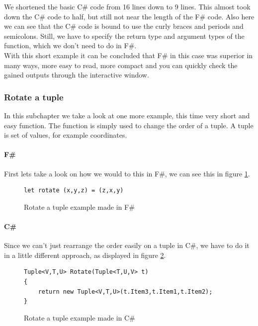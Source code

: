 \documentclass[12pt, a4paper]{article}
\begin{document}
We shortened the basic C\# code from 16 lines down to 9 lines. This almost took down the C\# code to half, but still not near the length of the F\# code. Also here we can see that the C\# code is bound to use the  curly braces and periods and semicolons. Still, we have to specify the return type and argument types of the function, which we don't need to do in F\#.\\

With this short example it can be concluded that F\# in this case was superior in many ways, more easy to read, more compact and you can quickly check the gained outputs through the interactive window. 

\newpage
\subsubsection{Rotate a tuple}
In this subchapter we take a look at one more example, this time very short and easy function. The function is simply used to change the order of a tuple. A tuple is set of values, for example coordinates.
   
\paragraph{F\#} First lets take a look on how we would to this in F\#, we can see this in figure \ref{fig:RotateTupleFSharp}.

\begin{figure}[!h]
\begin{lstlisting}
let rotate (x,y,z) = (z,x,y)
\end{lstlisting}
\caption{Rotate a tuple example made in F\#}
\label{fig:RotateTupleFSharp}
\end{figure}

\paragraph{C\#} Since we can’t just rearrange the order easily on a tuple in C\#, we have to do it in a little different approach, as displayed in figure \ref{fig:RotateTupleCSharp}.

\begin{figure}[!h]
\begin{lstlisting}
Tuple<V,T,U> Rotate(Tuple<T,U,V> t) 
{ 
    return new Tuple<V,T,U>(t.Item3,t.Item1,t.Item2); 
}
\end{lstlisting}
\caption{Rotate a tuple example made in C\#}
\label{fig:RotateTupleCSharp}
\end{figure}
\end{document}

